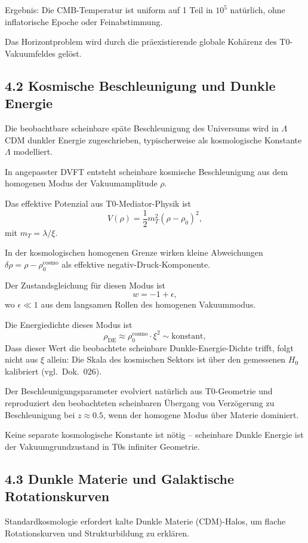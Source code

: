 	Ergebnis: Die CMB-Temperatur ist uniform auf 1 Teil in $10^5$ natürlich, ohne inflatorische Epoche oder Feinabstimmung.
	
	Das Horizontproblem wird durch die präexistierende globale Kohärenz des T0-Vakuumfeldes gelöst.
	
	\subsection{4.2 Kosmische Beschleunigung und Dunkle Energie}
	
	Die beobachtbare scheinbare späte Beschleunigung des Universums wird in $\Lambda$CDM dunkler Energie zugeschrieben, typischerweise als kosmologische Konstante $\Lambda$ modelliert.
	
	In angepasster DVFT entsteht scheinbare kosmische Beschleunigung aus dem homogenen Modus der Vakuumamplitude $\rho$.
	
	Das effektive Potenzial aus T0-Mediator-Physik ist
	\[
	V(\rho) = \frac{1}{2} m_T^2 (\rho - \rho_0)^2,
	\]
	mit $m_T = \lambda / \xi$.
	
	In der kosmologischen homogenen Grenze wirken kleine Abweichungen $\delta \rho = \rho - \rho_0^{\text{cosmo}}$ als effektive negativ-Druck-Komponente.
	
	Der Zustandsgleichung für diesen Modus ist
	\[
	w = -1 + \epsilon,
	\]
	wo $\epsilon \ll 1$ aus dem langsamen Rollen des homogenen Vakuummodus.
	
	Die Energiedichte dieses Modus ist
	\[
	\rho_{\text{DE}} \approx \rho_0^{\text{cosmo}} \cdot \xi^2 \sim \text{konstant},
	\]
	Dass dieser Wert die beobachtete scheinbare Dunkle-Energie-Dichte trifft, folgt nicht aus $\xi$ allein: Die Skala des kosmischen Sektors ist über den gemessenen $H_0$ kalibriert (vgl.\ Dok.~026).
	
	Der Beschleunigungsparameter evolviert natürlich aus T0-Geometrie und reproduziert den beobachteten scheinbaren Übergang von Verzögerung zu Beschleunigung bei $z \approx 0.5$, wenn der homogene Modus über Materie dominiert.
	
	Keine separate kosmologische Konstante ist nötig – scheinbare Dunkle Energie ist der Vakuumgrundzustand in T0s infiniter Geometrie.
	
	\subsection{4.3 Dunkle Materie und Galaktische Rotationskurven}
	
	Standardkosmologie erfordert kalte Dunkle Materie (CDM)-Halos, um flache Rotationskurven und Strukturbildung zu erklären.
	
